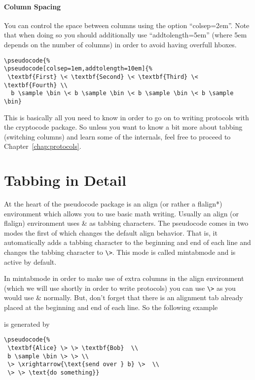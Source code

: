 \documentclass[a4paper]{report}
\begin{document}
\paragraph{Column Spacing}
You can control the space between columns using the option \enquote{colsep=2em}. Note that when doing so you should
additionally use \enquote{addtolength=5em} (where 5em depends on the number of columns) in order to avoid having
overfull hboxes.
\begin{center}
\end{center}
\begin{lstlisting}
\pseudocode{%
\pseudocode[colsep=1em,addtolength=10em]{%
 \textbf{First} \< \textbf{Second} \< \textbf{Third} \< \textbf{Fourth} \\
  b \sample \bin \< b \sample \bin \< b \sample \bin \< b \sample \bin}
\end{lstlisting}

This is basically all you need to know in order to go on to writing protocols with the
cryptocode package. So unless you want to know a bit more about tabbing (switching columns)
and learn some of the internals, feel free to proceed to Chapter~\ref{chap:protocols}.


\section{Tabbing in Detail}
At the heart of the pseudocode package is an align (or rather a flalign*) environment which allows you to use basic math writing. Usually an align (or flalign) environment uses \& as tabbing characters. The pseudocode comes in two modes the first of which changes the default align behavior. That is, it automatically adds a tabbing character to the beginning and end of each line and changes the tabbing character to \lstinline$\>$. This mode is called mintabmode and is active by default.

In mintabmode in order to make use of extra columns in the align environment (which we will use shortly in order to write protocols) you can use \lstinline$\>$ as you would use \& normally. But, don't forget that there is an alignment tab already placed at the beginning and end of each line. So the following example
\begin{center}
\end{center}
is generated by
\begin{lstlisting}
\pseudocode{%
 \textbf{Alice} \> \> \textbf{Bob}  \\
 b \sample \bin \> \> \\
 \> \xrightarrow{\text{send over } b} \>  \\
 \> \> \text{do something}}
\end{lstlisting}
\end{document}
